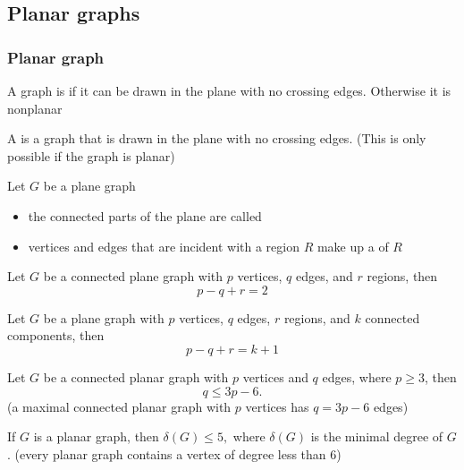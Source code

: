 \documentclass[aspectratio=43]{beamer}
\begin{document}


\subsection{Planar graphs}
\begin{frame}\frametitle{Planar graph}
\begin{definition}
A graph is  if it can be drawn in the plane with no crossing edges. Otherwise it is nonplanar
\end{definition}
\vfill
\begin{definition}
A  is a graph that is drawn in the plane with no crossing edges. (This is only possible if the graph is planar)
\end{definition}
\end{frame}



\begin{frame}
Let $G$ be a plane graph
\begin{itemize}
\item the connected parts of the plane are called 
\item vertices and edges that are incident with a region $R$ make up a  of $R$
\end{itemize}
\vfill
\begin{theorem}
Let $G$ be a connected plane graph with $p$ vertices, $q$ edges, and $r$ regions, then $$p-q+r=2$$
\end{theorem}
\vfill
\begin{corollary}
Let $G$ be a plane graph with $p$ vertices, $q$ edges, $r$ regions, and $k$ connected components, then $$p-q+r=k+1$$
\end{corollary}
\end{frame}


\begin{frame}
\begin{theorem}
Let $G$ be a connected planar graph with $p$ vertices and $q$ edges, where $p\geq 3$, then $$q\leq 3p-6.$$
(a maximal connected planar graph with $p$ vertices has $q=3p-6$ edges)
\end{theorem}
\vfill
\begin{corollary}
If $G$ is a planar graph, then $\delta(G)\leq 5,$
where $\delta(G)$ is the minimal degree of $G$.
(every planar graph contains a vertex of degree less than 6)
\end{corollary}
\end{frame}
\end{document}
